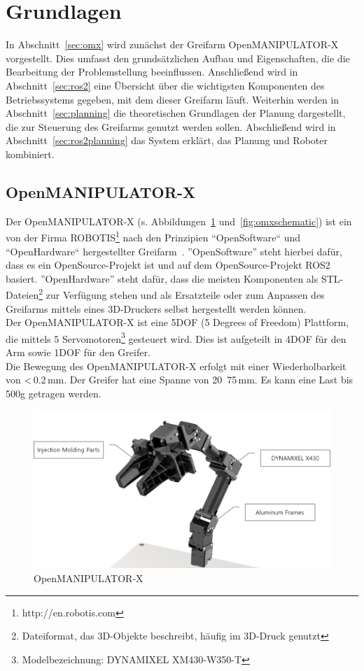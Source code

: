 \section {Grundlagen}
In Abschnitt~\ref{sec:omx} wird zunächst der Greifarm OpenMANIPULATOR-X vorgestellt.
Dies umfasst den grundsätzlichen Aufbau und Eigenschaften, die die Bearbeitung der Problemstellung beeinflussen.
Anschließend wird in Abschnitt~\ref{sec:ros2} eine Übersicht über die wichtigsten Komponenten des Betriebssystems gegeben, mit dem dieser Greifarm läuft.
Weiterhin werden in Abschnitt~\ref{sec:planning} die theoretischen Grundlagen der Planung dargestellt, die zur Steuerung des Greifarms genutzt werden sollen.
Abschließend wird in Abschnitt~\ref{sec:ros2planning} das System erklärt, das Planung und Roboter kombiniert.
\subsection{OpenMANIPULATOR-X}{\label{sec:omx}}
Der OpenMANIPULATOR-X (s. Abbildungen~\ref{fig:omx} und~\ref{fig:omxschematic}) ist ein von der Firma ROBOTIS{\footnote{http://en.robotis.com}} nach den Prinzipien ``OpenSoftware`` und ``OpenHardware`` hergestellter Greifarm~\cite{omxoverview}.
''OpenSoftware'' steht hierbei dafür, dass es ein OpenSource-Projekt ist und auf dem OpenSource-Projekt \ac{ROS2} basiert.
''OpenHardware'' steht dafür, dass die meisten Komponenten als STL-Dateien\footnote{Dateiformat, das 3D-Objekte beschreibt, häufig im 3D-Druck genutzt} zur Verfügung stehen und als Ersatzteile oder zum Anpassen des Greifarms mittels eines 3D-Druckers selbst hergestellt werden können.\\
Der OpenMANIPULATOR-X ist eine 5DOF (5 Degrees of Freedom) Plattform, die mittels 5 Servomotoren{\footnote{Modelbezeichnung: DYNAMIXEL XM430-W350-T}} gesteuert wird.
Dies ist aufgeteilt in 4DOF für den Arm sowie 1DOF für den Greifer.\\
Die Bewegung des OpenMANIPULATOR-X erfolgt mit einer Wiederholbarkeit von <\,0.2\,mm.
Der Greifer hat eine Spanne von 20~75\,mm.
Es kann eine Last bis 500g getragen werden.
\begin{figure}[ht!]
     \centering
     \includegraphics[width=.75\textwidth]{figs/omx}
     \caption[OpenMANIPULATOR-X]{OpenMANIPULATOR-X~\cite{omximg}}
     \label{fig:omx}
\end{figure}
